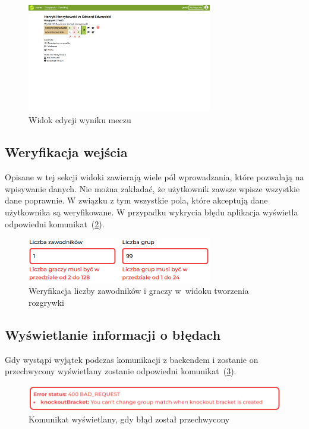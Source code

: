 \documentclass[shortabstract]{iithesis}
\begin{document}
\begin{figure}[H]
    \centering
    \includegraphics[width=0.72\textwidth,valign=t]{assets/interfejs/mecz_desktop.png}
    \caption{Widok edycji wyniku meczu}
    \label{fig:view_match_edit}
\end{figure}

\subsection{Weryfikacja wejścia}
Opisane w tej sekcji widoki zawierają wiele pól wprowadzania, które pozwalają na wpisywanie danych.
Nie można zakładać, że użytkownik zawsze wpisze wszystkie dane poprawnie.
W związku z tym wszystkie pola, które akceptują dane użytkownika są weryfikowane.
W przypadku wykrycia błędu aplikacja wyświetla odpowiedni komunikat~(\ref{fig:input_verification}).
\begin{figure}[H]
    \centering
    \includegraphics[width=0.72\textwidth,valign=t]{assets/interfejs/weryfikacja_wejscia.png}
    \caption{Weryfikacja liczby zawodników i graczy w~widoku tworzenia rozgrywki}
    \label{fig:input_verification}
\end{figure}

\subsection{Wyświetlanie informacji o błędach}
Gdy wystąpi wyjątek podczas komunikacji z backendem i zostanie on przechwycony wyświetlany zostanie odpowiedni komunikat~(\ref{fig:error_mesage}).
\begin{figure}[H]
    \centering
    \includegraphics[width=\textwidth,valign=t]{assets/interfejs/rozgrywki_error.png}
    \caption{Komunikat wyświetlany, gdy błąd został przechwycony}
    \label{fig:error_mesage}
\end{figure}
\end{document}
